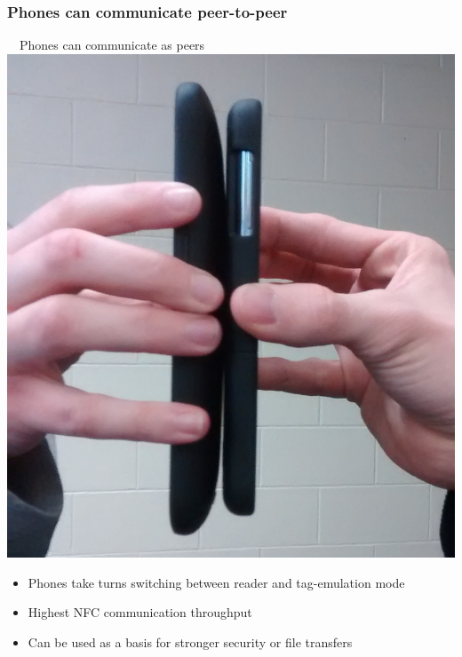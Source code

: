 \documentclass[unknownkeysallowed]{beamer}
\begin{document}
\begin{frame}
\frametitle{Phones can communicate peer-to-peer}
  \begin{center}
  \begin{minipage}{.7\textwidth}
  \begin{block}{~~Phones can communicate as peers}\centering
      \includegraphics[width=\linewidth,height=0.4\textheight,keepaspectratio]{figures/peer.jpg}
      \begin{itemize}
  		  \item{Phones take turns switching between reader and tag-emulation mode}
        \pause
  		  \item{Highest NFC communication throughput}
        \pause
  		  \item{Can be used as a basis for stronger security or file transfers}
     	\end{itemize}
  \end{block}
  \end{minipage}
  \end{center}
\end{frame}
\end{document}
